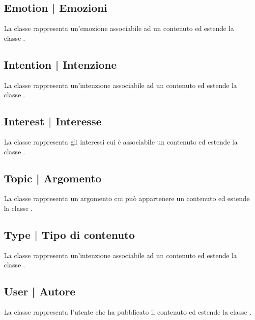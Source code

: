 \documentclass[10pt,a4paper,headinclude,footinclude,hidelinks]{scrreprt} %
\begin{document}
	\subsection[Emotion]{Emotion | Emozioni}
	\label{sec:stage:design:model:metadata-emotion}
	La classe \textit{} rappresenta un'emozione associabile ad un contenuto ed estende la classe \textit{}.

	\subsection[Intention]{Intention | Intenzione}
	\label{sec:stage:design:model:metadata-intention}
	La classe \textit{} rappresenta un'intenzione associabile ad un contenuto ed estende la classe \textit{}.

	\subsection[Interest]{Interest | Interesse}
	\label{sec:stage:design:model:metadata-interest}
	La classe \textit{} rappresenta gli interessi cui è associabile un contenuto ed estende la classe \textit{}.

	\subsection[Topic]{Topic | Argomento}
	\label{sec:stage:design:model:metadata-topic}
	La classe \textit{} rappresenta un argomento cui può appartenere un contenuto ed estende la classe \textit{}.

	\subsection[Type]{Type | Tipo di contenuto}
	\label{sec:stage:design:model:metadata-type}
	La classe \textit{} rappresenta un'intenzione associabile ad un contenuto ed estende la classe \textit{}.

	\subsection[User]{User | Autore}
	\label{sec:stage:design:model:metadata-user}
	La classe \textit{} rappresenta l'utente che ha pubblicato il contenuto ed estende la classe \textit{}.
\end{document}
